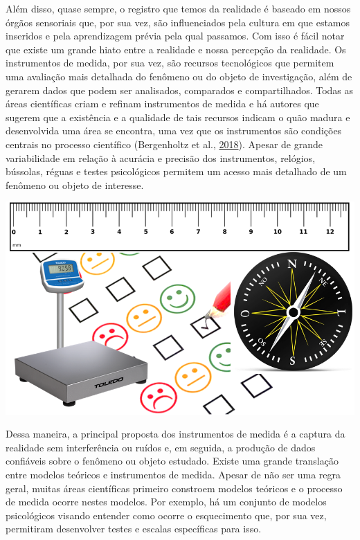 \documentclass[
]{book}
\begin{document}
Além disso, quase sempre, o registro que temos da realidade é baseado em
nossos órgãos sensoriais que, por sua vez, são influenciados pela
cultura em que estamos inseridos e pela aprendizagem prévia pela qual
passamos. Com isso é fácil notar que existe um grande hiato entre a
realidade e nossa percepção da realidade. Os instrumentos de medida, por
sua vez, são recursos tecnológicos que permitem uma avaliação mais
detalhada do fenômeno ou do objeto de investigação, além de gerarem
dados que podem ser analisados, comparados e compartilhados. Todas as
áreas científicas criam e refinam instrumentos de medida e há autores
que sugerem que a existência e a qualidade de tais recursos indicam o
quão madura e desenvolvida uma área se encontra, uma vez que os
instrumentos são condições centrais no processo científico (Bergenholtz
et al., \protect\hyperlink{ref-Bergenholtz2018}{2018}). Apesar de grande
variabilidade em relação à acurácia e precisão dos instrumentos,
relógios, bússolas, réguas e testes psicológicos permitem um acesso mais
detalhado de um fenômeno ou objeto de interesse.

\includegraphics{./img/cap_instrumentos.png}

Dessa maneira, a principal proposta dos instrumentos de medida é a
captura da realidade sem interferência ou ruídos e, em seguida, a
produção de dados confiáveis sobre o fenômeno ou objeto estudado. Existe
uma grande translação entre modelos teóricos e instrumentos de medida.
Apesar de não ser uma regra geral, muitas áreas científicas primeiro
constroem modelos teóricos e o processo de medida ocorre nestes modelos.
Por exemplo, há um conjunto de modelos psicológicos visando entender
como ocorre o esquecimento que, por sua vez, permitiram desenvolver
testes e escalas específicas para isso.
\end{document}
